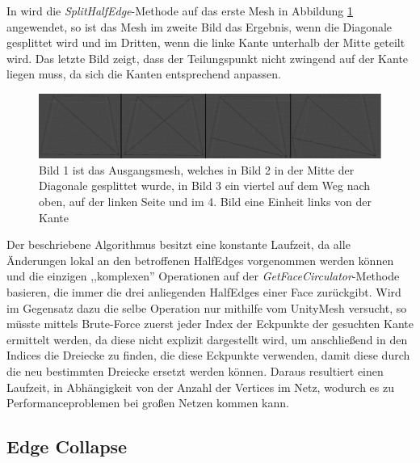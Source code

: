 In wird die \textit{SplitHalfEdge}-Methode auf das erste Mesh in Abbildung \ref{fig:meshmash} angewendet, so ist das Mesh im zweite Bild das Ergebnis, wenn die Diagonale gesplittet wird und im Dritten, wenn die linke Kante unterhalb der Mitte geteilt wird. Das letzte Bild zeigt, dass der Teilungspunkt nicht zwingend auf der Kante liegen muss, da sich die Kanten entsprechend anpassen.
\begin{figure}[H]
	\centering
	\includegraphics[width=1 \linewidth]{Images/meshmash}
	\caption{Bild 1 ist das Ausgangsmesh, welches in Bild 2 in der Mitte der Diagonale gesplittet wurde, in Bild 3 ein viertel auf dem Weg nach oben, auf der linken Seite und im 4. Bild eine Einheit links von der Kante}
	\label{fig:meshmash}
\end{figure}

Der beschriebene Algorithmus besitzt eine konstante Laufzeit, da alle \"Anderungen lokal an den betroffenen HalfEdges vorgenommen werden k\"onnen und die einzigen ,,komplexen'' Operationen auf der \textit{GetFaceCirculator}-Methode basieren, die immer die drei anliegenden HalfEdges einer Face zur\"uckgibt. Wird im Gegensatz dazu die selbe Operation nur mithilfe vom UnityMesh versucht, so m\"usste mittels Brute-Force zuerst jeder Index der Eckpunkte der gesuchten Kante ermittelt werden, da diese nicht explizit dargestellt wird, um anschlie{\ss}end in den Indices die Dreiecke zu finden, die diese Eckpunkte verwenden, damit diese durch die neu bestimmten Dreiecke ersetzt werden k\"onnen. Daraus resultiert einen Laufzeit, in Abh\"angigkeit von der Anzahl der Vertices im Netz, wodurch es zu Performanceproblemen bei gro{\ss}en Netzen kommen kann.

\subsection{Edge Collapse}

